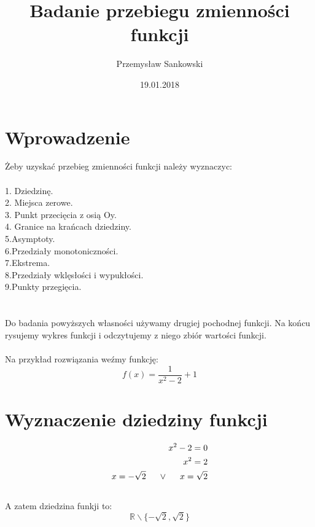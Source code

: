 \documentclass[10pt]{article}
\author{Przemysław Sankowski}
\date{19.01.2018}
\title{Badanie przebiegu zmienności funkcji}
\begin{document}
\maketitle
\noindent
\tableofcontents
\newpage


\section{Wprowadzenie}
Żeby uzyskać przebieg zmienności funkcji należy wyznaczyc: \\ \\
1. Dziedzinę. \\
2. Miejsca zerowe. \\
3. Punkt przecięcia z osią Oy. \\
4. Granice na krańcach dziedziny. \\
5.Asymptoty. \\
6.Przedziały monotoniczności. \\
7.Ekstrema. \\
8.Przedziały wklęsłości i wypukłości. \\
9.Punkty przegięcia. \\ \\ \\
Do badania powyższych własności używamy drugiej pochodnej funkcji.
Na końcu rysujemy wykres funkcji i odczytujemy z niego zbiór wartości funkcji. \\ \\
Na przykład rozwiązania weźmy funkcję: 
{\large \begin{equation*}
f(x)=\frac{1}{x^{2}-2} + 1
\end{equation*}}
\newpage


\section{Wyznaczenie dziedziny funkcji}
{\large \begin{eqnarray}
x^2 - 2 = 0 \\
x^2 = 2 \\
\label{dziedzina} x = - \sqrt{2} \hspace{0.5cm} \vee \hspace{0.5cm} x = \sqrt{2}
\end{eqnarray}} \\
A zatem dziedzina funkji to:
{\large \begin{equation*}
\mathbb{R}\backslash\{-\sqrt{2},\sqrt{2}\}
\end{equation*}}
\end{document}
